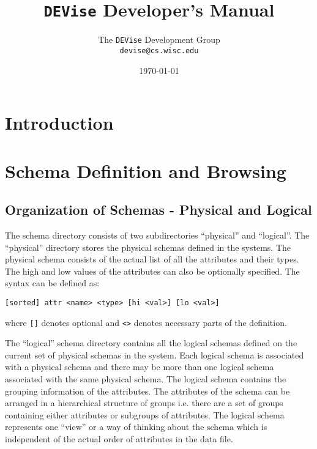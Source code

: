 
\def\Devise{{\tt DEVise} }
\def\filename#1{{\tt #1} }
\def\code#1{{\tt #1} }
\def\term#1{#1 }
\def\variable#1{{\tt #1} }


\title{\Devise Developer's Manual}
\author{The \Devise Development Group \\
\code{devise@cs.wisc.edu}
}
\date{\today}

\maketitle

\section{Introduction}

\section{Schema Definition and Browsing}

\subsection{Organization of Schemas - Physical and Logical}

The schema directory consists of two subdirectories ``physical'' and
``logical''. The ``physical'' directory stores the physical schemas
defined in the systems.  The physical schema consists of the actual
list of all the attributes and their types. The high and low values of
the attributes can also be optionally specified.  The syntax can be
defined as:

\code{[sorted] attr <name> <type> [hi <val>] [lo <val>]}

where \code{[]} denotes optional and \code{<>} denotes necessary parts
of the definition.

The ``logical'' schema directory contains all the logical schemas
defined on the current set of physical schemas in the system.  Each
logical schema is associated with a physical schema and there may be
more than one logical schema associated with the same physical
schema. The logical schema contains the grouping information of the
attributes.  The attributes of the schema can be arranged in a
hierarchical structure of groups i.e. there are a set of groups
containing either attributes or subgroups of attributes. The logical
schema represents one ``view'' or a way of thinking about the schema
which is independent of the actual order of attributes in the data
file.


